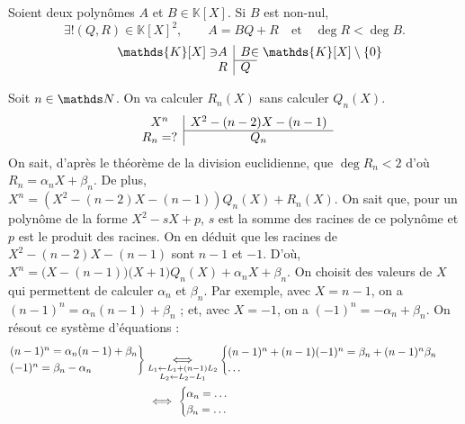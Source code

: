 \begin{thm}
	Soient deux polynômes $A$\/ et $B \in \mathds{K}[X]$. Si $B$\/ est non-nul, \[
		\exists! (Q,R) \in \mathds{K}[X]^2,\qquad A = BQ + R\quad\text{et}\quad\deg R < \deg B
	.\]
	\[
		\begin{array}{c|c}
			\mathllap{\mathds{K}[X] \ni}A&B\mathrlap{\in \mathds{K}[X]\setminus \{0\}}\\ \cline{2-2}
			R&Q\\
		\end{array}
	\]
\end{thm}

\begin{exo}
	Soit $n \in \N$. On va calculer $R_n(X)$\/ sans calculer $Q_n(X)$.
	\[
		\begin{array}{c|c}
			X^n&X^2 - (n-2)X - (n-1)\\ \cline{2-2}
			R_n = ?&Q_n\\
		\end{array}
	\]
	On sait, d'après le théorème de la division euclidienne, que $\deg R_n < 2$\/ d'où $R_n = \alpha_n X + \beta_n$. De plus, $X^n = \left( X^2 - (n-2)X - (n-1) \right) Q_n(X) + R_n(X)$. On sait que, pour un polynôme de la forme $X^2 - sX + p$, $s$\/ est la somme des racines de ce polynôme et $p$\/ est le produit des racines. On en déduit que les racines de $X^2 - (n-2)X - (n-1)$\/ sont $n-1$\/ et $-1$.
	D'où, $X^n = \big(X - (n-1)\big)\big(X+1\big) Q_n(X) + \alpha_n X + \beta_n$. On choisit des valeurs de $X$\/ qui permettent de calculer $\alpha_n$\/ et $\beta_n$.
	Par exemple, avec $X = n-1$, on a $(n-1)^n = \alpha_n (n-1) + \beta_n$\/ ; et, avec $X =-1$, on a $(-1)^n = -\alpha_n + \beta_n$. On résout ce système d'équations :
	\begin{align*}
		\begin{rcases*}
			(n-1)^n = \alpha_n (n-1) + \beta_n\\
			(-1)^n = \beta_n - \alpha_n 
		\end{rcases*} &\mathop{\iff}_{\substack{L_1 \leftarrow L_1 + (n-1) L_2\\L_2 \leftarrow L_2 - L_1}} \begin{cases}
		(n-1)^n + (n-1)(-1)^n = \beta_n + (n-1)^n \beta_n\\
		\ldots
		\end{cases}\\
		&\iff \begin{cases}
			\alpha_n = \ldots\\
			\beta_n = \ldots
		\end{cases}
	\end{align*}
\end{exo}

